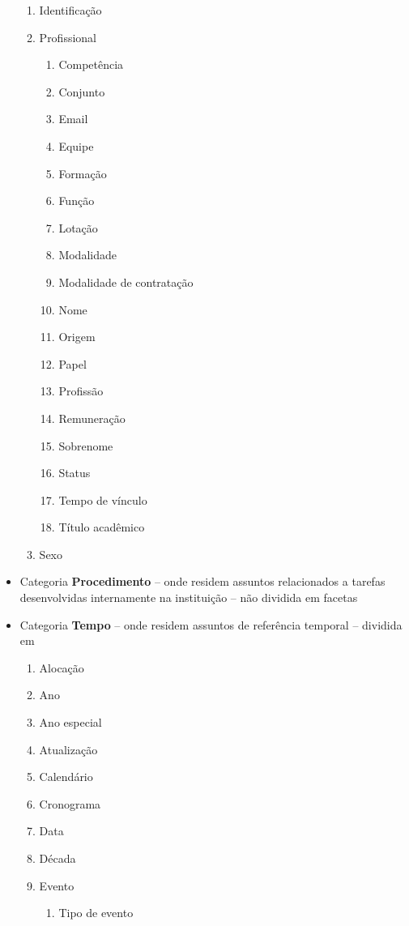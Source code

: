 \begin{multicols}{2}
\begin{itemize}
\begin{enumerate}
			\item Identificação				
			\item Profissional	\begin{enumerate}			
					\item Competência		
					\item Conjunto		
					\item Email		
					\item Equipe		
					\item Formação		
					\item Função		
					\item Lotação		
					\item Modalidade		
					\item Modalidade de contratação		
					\item Nome		
					\item Origem		
					\item Papel		
					\item Profissão		
					\item Remuneração		
					\item Sobrenome		
					\item Status		
					\item Tempo de vínculo		
					\item Título acadêmico	\end{enumerate}	
			\item Sexo				
\end{enumerate}	\item Categoria \textbf{Procedimento} -- onde residem assuntos relacionados a tarefas desenvolvidas internamente na instituição -- não dividida em facetas						
	\item Categoria \textbf{Tempo} -- onde residem assuntos de referência temporal -- dividida em	\begin{enumerate} 	\item Alocação				
			\item Ano				
			\item Ano especial				
			\item Atualização				
			\item Calendário				
			\item Cronograma				
			\item Data				
			\item Década				
			\item Evento	\begin{enumerate}			
					\item Tipo de evento	\end{enumerate}	

\end{enumerate}
\end{itemize}
\end{multicols}
